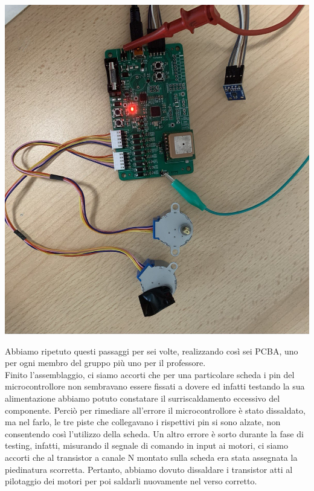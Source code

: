\begin{center}
\includegraphics[scale=0.4]{figures/image101.png}
\captionsetup{type=figure}
\end{center}

\noindent Abbiamo ripetuto questi passaggi per sei volte, realizzando così sei PCBA, uno per ogni membro del gruppo più uno per il professore.\\
Finito l’assemblaggio, ci siamo accorti che per una particolare scheda i pin del microcontrollore non sembravano 
essere fissati a dovere ed infatti testando la sua alimentazione abbiamo potuto constatare il surriscaldamento eccessivo 
del componente. Perciò per rimediare all’errore il microcontrollore è stato dissaldato, ma nel farlo, le tre piste che collegavano 
i rispettivi pin si sono alzate, non consentendo così l’utilizzo della scheda. Un altro errore è sorto durante la fase di testing, 
infatti, misurando il segnale di comando in input ai motori, ci siamo accorti che al transistor a canale N montato sulla scheda era 
stata assegnata la piedinatura scorretta. Pertanto, abbiamo dovuto dissaldare i transistor atti al pilotaggio dei motori per poi 
saldarli nuovamente nel verso corretto.

